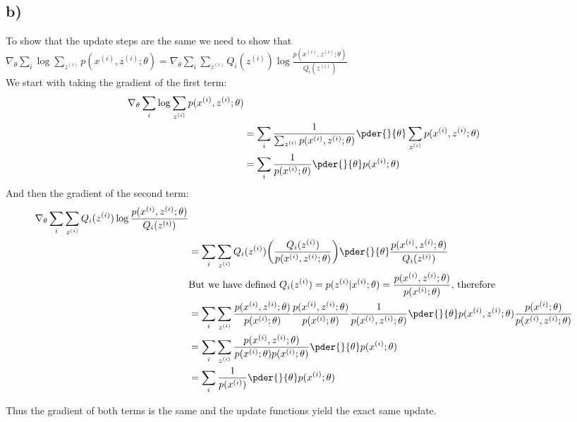 \documentclass[11pt]{article}
\begin{document}
\subsection*{b)}

To show that the update steps are the same we need to show that\\
$\nabla_\theta \sum_i \log \sum_{z^{(i)}} p(x^{(i)},z^{(i)};\theta) = \nabla_\theta \sum_i \sum_{z^{(i)}} Q_i(z^{(i)}) \log \frac{p(x^{(i)},z^{(i)};\theta)}{Q_i(z^{(i)})}$ \\

We start with taking the gradient of the first term:\\
\begin{align*}
    \nabla_\theta \sum_i \log \sum_{z^{(i)}} p(x^{(i)},z^{(i)};\theta)\\
     &= \sum_i \frac{1}{\sum_{z^{(i)}} p(x^{(i)},z^{(i)};\theta)} \pder{}{\theta} \sum_{z^{(i)}} p(x^{(i)},z^{(i)};\theta)\\
     &= \sum_i \frac{1}{p(x^{(i)};\theta)} \pder{}{\theta} p(x^{(i)};\theta)
\end{align*}
And then the gradient of the second term:\\
\begin{align*}
    \nabla_\theta \sum_i \sum_{z^{(i)}} Q_i(z^{(i)}) \log \frac{p(x^{(i)},z^{(i)};\theta)}{Q_i(z^{(i)})}\\
    &= \sum_i \sum_{z^{(i)}} Q_i(z^{(i)}) \bigg( \frac{Q_i(z^{(i)})}{p(x^{(i)},z^{(i)};\theta)} \bigg) \pder{}{\theta} \frac{p(x^{(i)},z^{(i)};\theta)}{Q_i(z^{(i)})}\\
    &\text{But we have defined $Q_i(z^{(i)}) = p(z^{(i)}|x^{(i)};\theta) = \frac{p(x^{(i)},z^{(i)};\theta)}{p(x^{(i)};\theta)}$, therefore}\\
    &= \sum_i \sum_{z^{(i)}} \frac{p(x^{(i)},z^{(i)};\theta)}{p(x^{(i)};\theta)} \frac{p(x^{(i)},z^{(i)};\theta)}{p(x^{(i)};\theta)} \frac{1}{p(x^{(i)},z^{(i)};\theta)} \pder{}{\theta} p(x^{(i)},z^{(i)};\theta) \frac{p(x^{(i)};\theta)}{p(x^{(i)},z^{(i)};\theta)}\\
    &= \sum_i \sum_{z^{(i)}} \frac{p(x^{(i)},z^{(i)};\theta)}{p(x^{(i)};\theta) p(x^{(i)};\theta)} \pder{}{\theta} p(x^{(i)};\theta)\\
    &= \sum_i \frac{1}{p(x^{(i)})} \pder{}{\theta} p(x^{(i)};\theta)
\end{align*}

Thus the gradient of both terms is the same and the update functions yield the exact same update.
\end{document}

